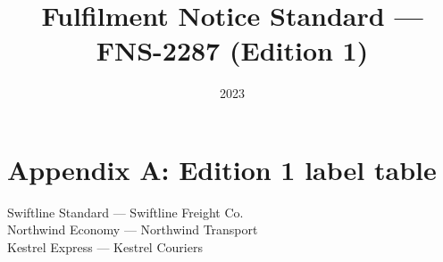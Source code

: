 \documentclass{article}
\title{Fulfilment Notice Standard --- FNS-2287 (Edition 1)}
\date{2023}
\begin{document}
\maketitle
\section{Appendix A: Edition 1 label table}
Swiftline Standard --- Swiftline Freight Co.\\
Northwind Economy --- Northwind Transport\\
Kestrel Express --- Kestrel Couriers
\end{document}
